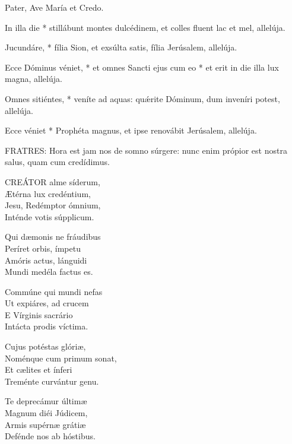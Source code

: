 Pater, Ave María et Credo.




 In illa die * stillábunt montes dulcédinem, et colles fluent lac et mel, allelúja.


 Jucundáre, * fília Sion, et exsúlta satis, fília Jerúsalem, allelúja.

 Ecce Dóminus véniet, * et omnes Sancti ejus cum eo * et erit in die illa lux magna, allelúja.

 Omnes sitiéntes, * veníte ad aquas: quǽrite Dóminum, dum inveníri potest, allelúja.

 Ecce véniet * Prophéta magnus, et ipse renovábit Jerúsalem, allelúja.


\lettrine[lines=2]{F}{RATRES}: Hora est jam nos de somno súrgere: nunc enim própior est nostra salus, quam cum credídimus.


\lettrine[lines=2]{C}{REÁTOR} alme síderum,\\
Ætérna lux credéntium,\\
Jesu, Redémptor ómnium,\\
Inténde votis súpplicum.

Qui dæmonis ne fráudibus\\
Períret orbis, ímpetu\\
Amóris actus, lánguidi\\
Mundi medéla factus es.

Commúne qui mundi nefas\\
Ut expiáres, ad crucem\\
E Vírginis sacrário\\
Intácta prodis víctima.

Cujus potéstas glóriæ,\\
Noménque cum primum sonat,\\
Et cælites et ínferi\\
Treménte curvántur genu.

Te deprecámur últimæ\\
Magnum diéi Júdicem,\\
Armis supérnæ grátiæ\\
Defénde nos ab hóstibus.

